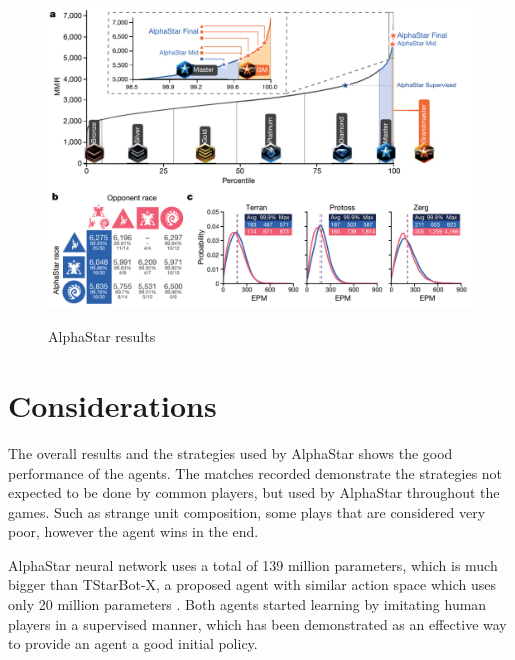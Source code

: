 \documentclass[
    article, 
    12pt,				%
	oneside,			%
	a4paper,			%
	chapter=TITLE,		%
	section=TITLE,		%
	english,			%
	english,				%
	sumario=tradicional
]{abntex2}
\begin{document}
\begin{figure}[ht]
    \centering
    \caption{AlphaStar results}
    \includegraphics[width=\textwidth]{images/results.png}
    \label{fig:alphaStar_results}
\end{figure}


\section{Considerations}

The overall results and the strategies used by AlphaStar shows the good performance of the agents. 
The matches recorded demonstrate the strategies not expected to be done by common players, but used by AlphaStar throughout the games.
Such as strange unit composition, some plays that are considered very poor, however the agent wins in the end.

AlphaStar neural network uses a total of 139 million parameters, which is much bigger than TStarBot-X, a proposed agent with similar action space which uses only 20 million parameters \cite{han_tstarbotx_2021}.
Both agents started learning by imitating human players in a supervised manner, which has been demonstrated as an effective way to provide an agent a good initial policy.



\end{document}
